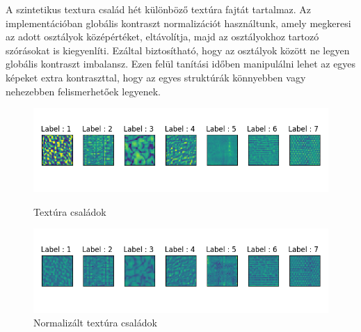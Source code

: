 \documentclass[12pt, english]{article}
\begin{document}
\vspace{4mm}

\par A szintetikus textura család hét különböző textúra fajtát tartalmaz. Az implementációban globális kontraszt normalizációt használtunk, amely megkeresi az adott osztályok középértéket, eltávolítja, majd az osztályokhoz tartozó szórásokat is kiegyenlíti. Ezáltal biztosítható, hogy az osztályok között ne legyen globális kontraszt imbalansz. Ezen felül tanítási időben manipulálni lehet az egyes képeket extra kontraszttal, hogy az egyes struktúrák könnyebben vagy nehezebben felismerhetőek legyenek.

\vspace{4mm}

\begin{figure}[H] 
  \label{fig:texture-families} 
  \begin{minipage}{0.48\linewidth}
    \centering
    \includegraphics[width=.95\linewidth]{default.png} 
    \caption{Textúra családok} 
  \end{minipage}
  \begin{minipage}{0.48\linewidth}
    \centering
    \includegraphics[width=.95\linewidth]{normalized.png} 
    \caption{Normalizált textúra családok} 
  \end{minipage} 
  

\end{figure}
\end{document}
